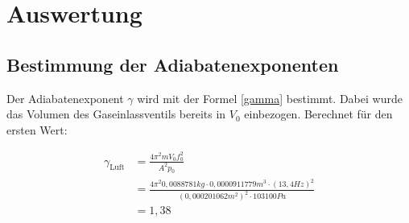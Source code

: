\chapter{Auswertung}
    	\section{Bestimmung der Adiabatenexponenten}
         Der Adiabatenexponent $\gamma$ wird mit der Formel \eqref{gamma} bestimmt. Dabei wurde das Volumen des Gaseinlassventils bereits in $V_0$ einbezogen. Berechnet für den ersten Wert:
         
         \begin{align*}
         	\gamma_{\text{Luft}} &= \frac{4\pi^2 m V_0f_0^2}{A^2 p_0} \\
            	&= \frac{4\pi^2 0,0088781 kg \cdot 0,0000911779 m^3 \cdot (13,4 Hz)^2}{(0,000201062 m^2)^2 \cdot 103100 Pa} \\
                &= 1,38
         \end{align*}
        
        
       
